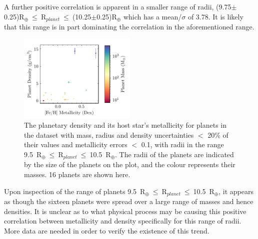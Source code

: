 \documentclass[a4paper,twocolumn,12pt]{article}
\begin{document}
A further positive correlation is apparent in a smaller range of radii, (9.75$\pm$0.25)R$_{\oplus}~\leq~$R$_{planet}~\leq~$(10.25$\pm$0.25)R$_{\oplus}$ which has a mean/$\sigma$ of 3.78. It is likely that this range is in part dominating the correlation in the aforementioned range.

\begin{figure}[h!]
    \centering
    \includegraphics[width=0.5\textwidth]{Graphs/FeH vs Density Planet Plot Radius 9.5 to 10.5.pdf}
    \caption{The planetary density and its host star's metallicity for planets in the dataset with mass, radius and density uncertainties $<$ 20\% of their values and metallicity errors $<$ 0.1, with radii in the range 9.5~R$_{\oplus}~\leq~$R$_{planet}~\leq~$10.5~R$_{\oplus}$. The radii of the planets are indicated by the size of the planets on the plot, and the colour represents their masses. 16 planets are shown here.}
    \label{figure: Fe/H vs Density correlations - Radii range 2}
\end{figure}

Upon inspection of the range of planets 9.5~R$_{\oplus}~\leq~$R$_{planet}~\leq~$10.5~R$_{\oplus}$, it appears as though the sixteen planets were spread over a large range of masses and hence densities. It is unclear as to what physical process may be causing this positive correlation between metallicity and density specifically for this range of radii. More data are needed in order to verify the existence of this trend.



\end{document}
